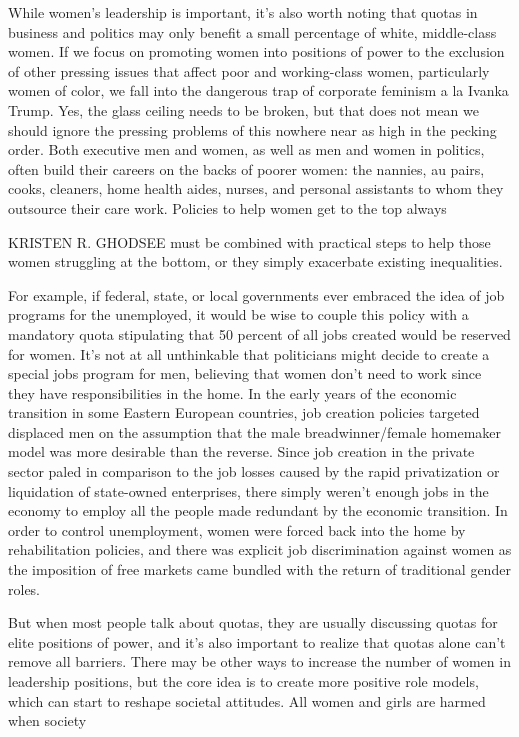  \par 
While women’s leadership is important, it’s also worth noting that quotas in business and politics may only benefit a small percentage of white, middle-class women. If we focus on promoting women into positions of power to the exclusion of other pressing issues that affect poor and working-class women, particularly women of color, we fall into the dangerous trap of corporate feminism a la Ivanka Trump. Yes, the glass ceiling needs to be broken, but that does not mean we should ignore the pressing problems of this nowhere near as high in the pecking order. Both executive men and women, as well as men and women in politics, often build their careers on the backs of poorer women: the nannies, au pairs, cooks, cleaners, home health aides, nurses, and personal assistants to whom they outsource their care work. Policies to help women get to the top always
 \par 
KRISTEN R. GHODSEE must be combined with practical steps to help those women struggling at the bottom, or they simply exacerbate existing inequalities.
 \par 
For example, if federal, state, or local governments ever embraced the idea of job programs for the unemployed, it would be wise to couple this policy with a mandatory quota stipulating that {\color{blue}50} percent of all jobs created would be reserved for women. It’s not at all unthinkable that politicians might decide to create a special jobs program for men, believing that women don’t need to work since they have responsibilities in the home. In the early years of the economic transition in some Eastern European countries, job creation policies targeted displaced men on the assumption that the male breadwinner/female homemaker model was more desirable than the reverse. Since job creation in the private sector paled in comparison to the job losses caused by the rapid privatization or liquidation of state-owned enterprises, there simply weren’t enough jobs in the economy to employ all the people made redundant by the economic transition. In order to control unemployment, women were forced back into the home by rehabilitation policies, and there was explicit job discrimination against women as the imposition of free markets came bundled with the return of traditional gender roles.
 \par 
But when most people talk about quotas, they are usually discussing quotas for elite positions of power, and it’s also important to realize that quotas alone can’t remove all barriers. There may be other ways to increase the number of women in leadership positions, but the core idea is to create more positive role models, which can start to reshape societal attitudes. All women and girls are harmed when society
